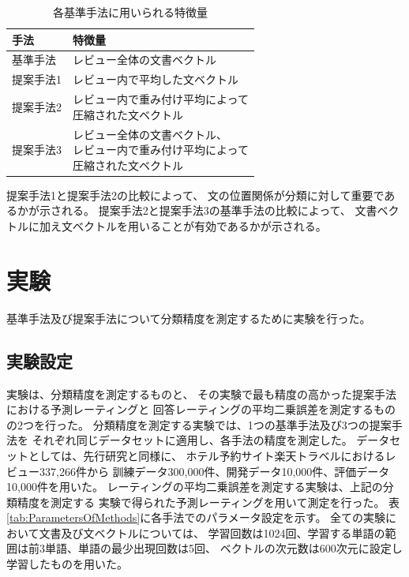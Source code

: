 \documentclass[twocolumn,a4paper]{ltjarticle}
\begin{document}
\begin{table}
  \caption{各基準手法に用いられる特徴量}
  \centering
  \begin{tabularx}{\linewidth}{l | l}\label{tab:MethodFeatures}
    手法 & 特徴量 \\
    \hline
    基準手法  & レビュー全体の文書ベクトル \\
    提案手法1 & レビュー内で平均した文ベクトル \\
    提案手法2 & \makecell[l]{レビュー内で重み付け平均によって \\
                             圧縮された文ベクトル} \\
    提案手法3 & \makecell[l]{レビュー全体の文書ベクトル、\\
                             レビュー内で重み付け平均によって \\
                             圧縮された文ベクトル} \\
  \end{tabularx}
\end{table}

提案手法1と提案手法2の比較によって、
文の位置関係が分類に対して重要であるかが示される。
提案手法2と提案手法3の基準手法の比較によって、
文書ベクトルに加え文ベクトルを用いることが有効であるかが示される。


\section{実験}

基準手法及び提案手法について分類精度を測定するために実験を行った。


\subsection{実験設定}

実験は、分類精度を測定するものと、
その実験で最も精度の高かった提案手法における予測レーティングと
回答レーティングの平均二乗誤差を測定するものの2つを行った。
分類精度を測定する実験では、1つの基準手法及び3つの提案手法を
それぞれ同じデータセットに適用し、各手法の精度を測定した。
データセットとしては、先行研究\cite{fujitani15}と同様に、
ホテル予約サイト楽天トラベルにおけるレビュー337,266件から
訓練データ300,000件、開発データ10,000件、評価データ10,000件を用いた。
レーティングの平均二乗誤差を測定する実験は、上記の分類精度を測定する
実験で得られた予測レーティングを用いて測定を行った。
表\ref{tab:ParametersOfMethods}に各手法でのパラメータ設定を示す。
全ての実験において文書及び文ベクトルについては、
学習回数は1024回、学習する単語の範囲は前3単語、単語の最少出現回数は5回、
ベクトルの次元数は600次元に設定し学習したものを用いた。
\end{document}
